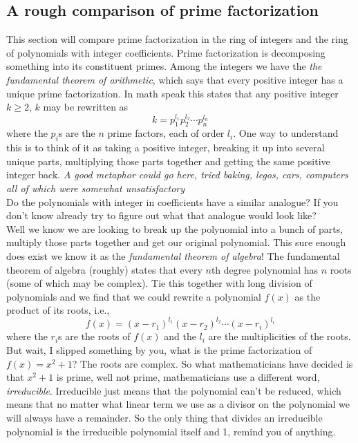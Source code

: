 \documentclass[12pt]{article}
\begin{document}
\subsection*{A rough comparison of prime factorization}
This section will compare prime factorization in the ring of integers and the ring of polynomials with integer coefficients.  Prime factorization is decomposing something into its constituent primes.  Among the integers we have the \emph{the fundamental theorem of arithmetic}, which says that every positive integer has a unique prime factorization.  In math speak this states that any positive integer $k \geq 2$, $k$ may be rewritten as 
$$k = p_1^{l_1} p_2^{l_2} \cdots p_n^{l_n}$$ 
where the $p_i$s are the $n$ prime factors, each of order $l_i$.  One way to understand this is to think of it as taking a positive integer, breaking it up into several unique parts, multiplying those parts together and getting the same positive integer back. \emph{A good metaphor could go here, tried baking, legos, cars, computers all of which were somewhat unsatisfactory}  \\

Do the polynomials with integer in coefficients have a similar analogue?  If you don't know already try to figure out what that analogue would look like?\\

Well we know we are looking to break up the polynomial into a bunch of parts, multiply those parts together and get our original polynomial.  This sure enough does exist we know it as the \emph{fundamental theorem of algebra}!  The fundamental theorem of algebra (roughly) states  that every $n$th degree polynomial has $n$ roots (some of which may be complex).  Tie this together with long division of polynomials and we find that we could rewrite a polynomial $f(x)$ as the product of its roots, i.e., 
$$ f(x) = (x-r_1)^{l_1}(x-r_2)^{l_2}\cdots(x-r_i)^{l_i}$$
where the $r_i$s are the roots of $f(x)$ and the $l_i$ are the multiplicities of the roots.\\

But wait, I slipped something by you, what is the prime factorization of $f(x)= x^2 + 1$?  The roots are complex.  So what mathematicians have decided is that $x^2 + 1$ is prime, well not prime, mathematicians use a different word, \emph{irreducible}.  Irreducible just means that the polynomial can't be reduced, which means that no matter what linear term we use as a divisor on the polynomial we will always have a remainder.  So the only thing that divides an irreducible polynomial is the irreducible polynomial itself and 1, remind you of anything.
\end{document}
